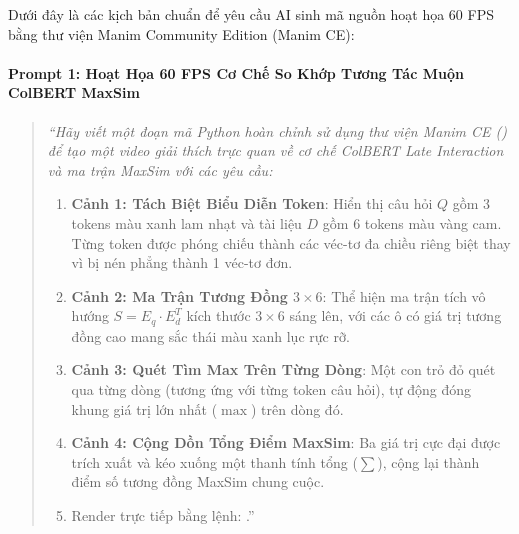 \begin{simulationbox}
Dưới đây là các kịch bản chuẩn để yêu cầu AI sinh mã nguồn hoạt họa 60 FPS bằng thư viện Manim Community Edition (Manim CE):

\paragraph{Prompt 1: Hoạt Họa 60 FPS Cơ Chế So Khớp Tương Tác Muộn ColBERT MaxSim}
\begin{quote}\small\itshape
``Hãy viết một đoạn mã Python hoàn chỉnh sử dụng thư viện Manim CE () để tạo một video giải thích trực quan về cơ chế ColBERT Late Interaction và ma trận MaxSim với các yêu cầu:
\begin{enumerate}
  \item \textbf{Cảnh 1: Tách Biệt Biểu Diễn Token}: Hiển thị câu hỏi $Q$ gồm 3 tokens màu xanh lam nhạt và tài liệu $D$ gồm 6 tokens màu vàng cam. Từng token được phóng chiếu thành các véc-tơ đa chiều riêng biệt thay vì bị nén phẳng thành 1 véc-tơ đơn.
  \item \textbf{Cảnh 2: Ma Trận Tương Đồng $3 \times 6$}: Thể hiện ma trận tích vô hướng $S = E_q \cdot E_d^T$ kích thước $3 \times 6$ sáng lên, với các ô có giá trị tương đồng cao mang sắc thái màu xanh lục rực rỡ.
  \item \textbf{Cảnh 3: Quét Tìm Max Trên Từng Dòng}: Một con trỏ đỏ quét qua từng dòng (tương ứng với từng token câu hỏi), tự động đóng khung giá trị lớn nhất ($\max$) trên dòng đó.
  \item \textbf{Cảnh 4: Cộng Dồn Tổng Điểm MaxSim}: Ba giá trị cực đại được trích xuất và kéo xuống một thanh tính tổng ($\sum$), cộng lại thành điểm số tương đồng MaxSim chung cuộc.
  \item Render trực tiếp bằng lệnh: .''
\end{enumerate}
\end{quote}


\end{simulationbox}
